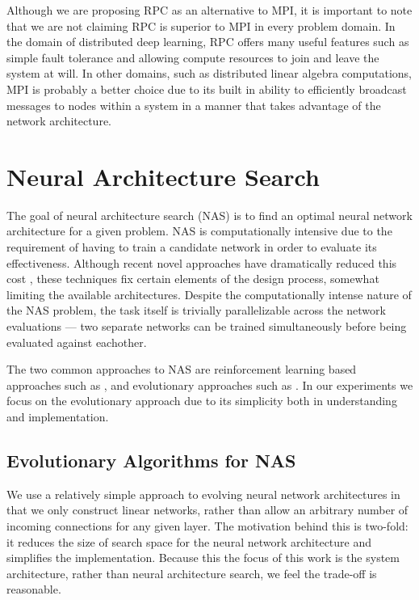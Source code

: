 \documentclass[conference]{IEEEtran}
\begin{document}
Although we are proposing RPC as an alternative to MPI, it is important to note that
we are not claiming RPC is superior to MPI in every problem domain. In the domain of
distributed deep learning, RPC offers many useful features such as simple fault
tolerance and allowing compute resources to join and leave the system at will. In other
domains, such as distributed linear algebra computations, MPI is probably a better
choice due to its built in ability to efficiently broadcast messages to nodes within
a system in a manner that takes advantage of the network architecture.

\section{Neural Architecture Search}
The goal of neural architecture search (NAS) is to find an optimal neural network
architecture for a given problem. NAS is computationally intensive due to the
requirement of having to train a candidate network in order to evaluate its
effectiveness. Although recent novel approaches have dramatically reduced this
cost \cite{DBLP:journals/corr/abs-1708-05344, pmlr-v80-pham18a}, these techniques
fix certain elements of the design process, somewhat limiting the available
architectures. Despite the computationally intense nature of the NAS problem,
the task itself is trivially parallelizable across the network evaluations ---
two separate networks can be trained simultaneously before being evaluated against
eachother.

The two common approaches to NAS are reinforcement learning based approaches such
as \cite{45826, Kyriakides:2018:NAS:3200947.3208068, pmlr-v80-pham18a}, and
evolutionary approaches such as \cite{DBLP:journals/corr/abs-1711-00436,
  DBLP:journals/corr/MiikkulainenLMR17, DBLP:conf/icml/RealMSSSTLK17}. In our
experiments we focus on the evolutionary approach due to its simplicity both in
understanding and implementation.

\subsection{Evolutionary Algorithms for NAS}
We use a relatively simple approach to evolving neural network architectures
in that we only construct linear networks, rather than allow an arbitrary
number of incoming connections for any given layer. The motivation behind
this is two-fold: it reduces the size of search space for the neural network
architecture and simplifies the implementation. Because this the focus of
this work is the system architecture, rather than neural architecture search,
we feel the trade-off is reasonable.
\end{document}
